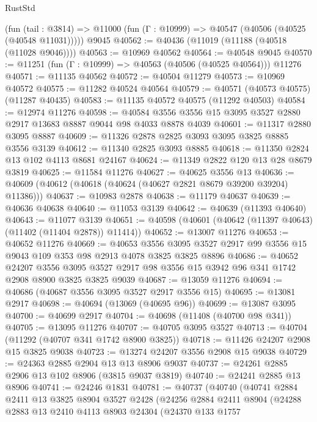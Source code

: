 \begin{lexlean}{RustStd}
\begin{coremodule}
    (fun (tail : @3814) => @11000 (fun (Γ : @10999) => @40547 (@40506 (@40525 (@40548 @11031)))))
    @9045
@40562 := @40436 (@11019 (@11188 (@40518 (@11028 @9046))))
@40563 := @10969 @40562
@40564 := @40548 @9045
@40570 := @11251 (fun (Γ : @10999) => @40563 (@40506 (@40525 @40564))) @11276
@40571 := @11135 @40562
@40572 := @40504 @11279
@40573 := @10969 @40572
@40575 := @11282 @40524 @40564
@40579 := @40571 (@40573 @40575) (@11287 @40435)
@40583 := @11135 @40572 @40575 (@11292 @40503)
@40584 := @12974 @11276
@40598 := @40584 @3556 @3556 @15 @3095 @3527 @2880 @2917 @13683 @8887 @9044 @98 @4033 @8878 @4039
@40601 := @11317 @2880 @3095 @8887
@40609 := @11326 @2878 @2825 @3093 @3095 @3825 @8885 @3556 @3139
@40612 := @11340 @2825 @3093 @8885
@40618 := @11350 @2824 @13 @102 @4113 @8681 @24167
@40624 := @11349 @2822 @120 @13 @28 @8679 @3819
@40625 := @11584 @11276
@40627 := @40625 @3556 @13
@40636 := @40609 (@40612 (@40618 (@40624 (@40627 @2821 @8679 @39200 @39204) @11386)))
@40637 := @10983 @2878
@40638 := @11179 @40637
@40639 := @40636 @40638
@40640 := @11053 @3139
@40642 := @40639 (@11393 @40640)
@40643 := @11077 @3139
@40651 := @40598 (@40601 (@40642 (@11397 @40643) (@11402 (@11404 @2878)) @11414))
@40652 := @13007 @11276
@40653 := @40652 @11276
@40669 := @40653
    @3556
    @3095
    @3527
    @2917
    @99
    @3556
    @15
    @9043
    @109
    @353
    @98
    @2913
    @4078
    @3825
    @3825
    @8896
@40686 := @40652
    @24207
    @3556
    @3095
    @3527
    @2917
    @98
    @3556
    @15
    @3942
    @96
    @341
    @1742
    @2908
    @8900
    @3825
    @3825
    @9039
@40687 := @13059 @11276
@40694 := @40686 (@40687 @3556 @3095 @3527 @2917 @3556 @15)
@40695 := @13081 @2917
@40698 := @40694 (@13069 (@40695 @96))
@40699 := @13087 @3095
@40700 := @40699 @2917
@40704 := @40698 (@11408 (@40700 @98 @341))
@40705 := @13095 @11276
@40707 := @40705 @3095 @3527
@40713 := @40704 (@11292 (@40707 @341 @1742 @8900 @3825))
@40718 := @11426 @24207 @2908 @15 @3825 @9038
@40723 := @13274 @24207 @3556 @2908 @15 @9038
@40729 := @24363 @2885 @2904 @13 @13 @8906 @9037
@40737 := @24261 @2885 @2906 @13 @102 @8906 (@3815 @9037 @3819)
@40740 := @24241 @2885 @13 @8906
@40741 := @24246 @1831
@40781 := @40737
    (@40740
      (@40741
        @2884
        @2411
        @13
        @3825
        @8904
        @3527
        @2428
        (@24256
          @2884
          @2411
          @8904
          (@24288
            @2883
            @13
            @2410
            @4113
            @8903
            @24304
            (@24370
              @133
              @1757

\end{coremodule}
\end{lexlean}
